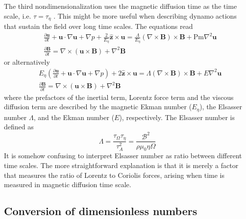 The third nondimensionalization uses the magnetic diffusion time as the time scale, i.e. $\tau = \tau_\eta$ \parencite{luo_waves2_2022}. This might be more useful when describing dynamo actions that sustain the field over long time scales. The equations read
\[
    \begin{aligned}
        & \frac{\partial \mathbf{u}}{\partial t} + \mathbf{u}\cdot \nabla \mathbf{u} + \nabla p + \frac{2}{E_\eta} \hat{\mathbf{z}}\times \mathbf{u} = \frac{\Lambda}{E_\eta} (\nabla\times\mathbf{B})\times \mathbf{B} + \mathrm{Pm} \nabla^2 \mathbf{u} \\ 
        & \frac{\partial \mathbf{B}}{\partial t} = \nabla\times (\mathbf{u}\times \mathbf{B}) + \nabla^2 \mathbf{B}
    \end{aligned}
\]
or alternatively 
\begin{equation}
    \begin{aligned}
        & E_\eta \left(\frac{\partial \mathbf{u}}{\partial t} + \mathbf{u}\cdot \nabla \mathbf{u} + \nabla p\right) + 2 \hat{\mathbf{z}}\times \mathbf{u} = \Lambda (\nabla\times\mathbf{B})\times \mathbf{B} + E \nabla^2 \mathbf{u} \\ 
        & \frac{\partial \mathbf{B}}{\partial t} = \nabla\times (\mathbf{u}\times \mathbf{B}) + \nabla^2 \mathbf{B}
    \end{aligned}
\end{equation}
where the prefactors of the inertial term, Lorentz force term and the viscous diffusion term are described by the magnetic Ekman number ($E_\eta$), the Elsasser number $\Lambda$, and the Ekman number ($E$), respectively. The Elsasser number is defined as
\begin{equation}
\Lambda = \frac{\tau_\Omega \tau_\eta}{\tau_A^2} = \frac{\mathscr{B}^2}{\rho \mu_0 \eta \Omega}
\end{equation}
It is somehow confusing to interpret Elsasser number as ratio between different time scales. The more straightforward explanation is that it is merely a factor that measures the ratio of Lorentz to Coriolis forces, arising when time is measured in magnetic diffusion time scale.

\subsection{Conversion of dimensionless numbers}

